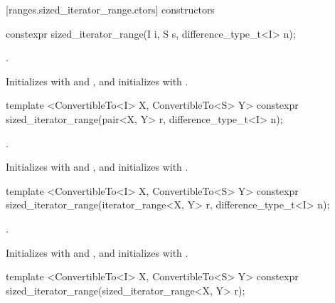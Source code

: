[ranges.sized_iterator_range.ctors]{ constructors}

%
\begin{itemdecl}
constexpr sized_iterator_range(I i, S s, difference_type_t<I> n);
\end{itemdecl}

\begin{itemdescr}
\pnum
\requires {}.

\pnum
\effects Initializes  with  and , and initializes
 with .
\end{itemdescr}

%
\begin{itemdecl}
template <ConvertibleTo<I> X, ConvertibleTo<S> Y>
  constexpr sized_iterator_range(pair<X, Y> r, difference_type_t<I> n);
\end{itemdecl}

\begin{itemdescr}
\pnum
\requires {}.

\pnum
\effects Initializes  with  and , and
initializes  with .
\end{itemdescr}

%
\begin{itemdecl}
template <ConvertibleTo<I> X, ConvertibleTo<S> Y>
  constexpr sized_iterator_range(iterator_range<X, Y> r, difference_type_t<I> n);
\end{itemdecl}

\begin{itemdescr}
\pnum
\requires {}.

\pnum
\effects Initializes  with  and , and
initializes  with .
\end{itemdescr}

%
\begin{itemdecl}
template <ConvertibleTo<I> X, ConvertibleTo<S> Y>
  constexpr sized_iterator_range(sized_iterator_range<X, Y> r);
\end{itemdecl}

